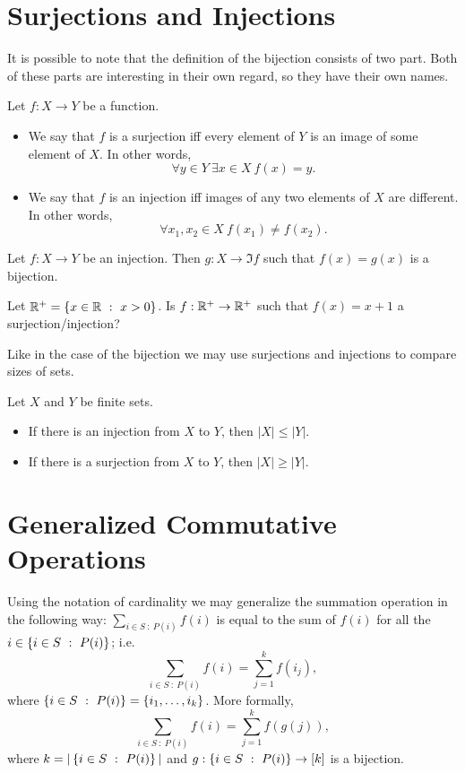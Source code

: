 \section{Surjections and Injections}

It is possible to note that the definition of the bijection consists of two part.
Both of these parts are interesting in their own regard, so they have their own
names.
\begin{definition}
    Let $f : X \to Y$ be a function.
    \begin{itemize}
        \item We say that $f$ is a surjection iff every element of $Y$ is an image
            of some element of $X$. In other words,
            \[
                \forall y \in Y~\exists x \in X\ f(x) = y.
            \]
        \item We say that $f$ is an injection iff images of any two elements
            of $X$ are different. In other words,
            \[
                \forall x_1, x_2 \in X\ f(x_1) \neq f(x_2).
            \]
    \end{itemize}
\end{definition}

\begin{remark}
    Let $f : X \to Y$ be an injection. Then $g : X \to \Im f$ such that
    $f(x) = g(x)$ is a bijection.
\end{remark}

\begin{exercise}
    Let $\R^+ = \set[x > 0]{x \in \R}$. Is $f : {\mathbb{R}}^+ \to {\mathbb{R}}^+$ such that
    $f(x) = x + 1$ a surjection/injection?
\end{exercise}

Like in the case of the bijection we may use surjections and injections to
compare sizes of sets.
\begin{theorem}
\label{theorem:injections-surjections-inequalities}
    Let $X$ and $Y$ be finite sets.
    \begin{itemize}
        \item If there is an injection from $X$ to $Y$, then $|X| \le |Y|$.
        \item If there is a surjection from $X$ to $Y$, then $|X| \ge |Y|$.
    \end{itemize}
\end{theorem}

\section{Generalized Commutative Operations}
\label{section:generalized-sum}
Using the notation of cardinality we may generalize the summation operation in
the following way: $\sum_{i \in S ~:~ P(i)} f(i)$ is equal to the sum of
$f(i)$ for all the $i \in \set[P(i)]{i \in S}$; i.e.
\[
    \sum_{i \in S ~:~ P(i)} f(i) = \sum_{j = 1}^k f(i_j),
\]
where $\set[P(i)]{i \in S} = \set{i_1, \dots, i_k}$. More formally,
\[
    \sum_{i \in S ~:~ P(i)} f(i) = \sum_{j = 1}^k f(g(j)),
\]
where $k = |\set[P(i)]{i \in S}|$ and $g : \set[P(i)]{i \in S} \to \range{k}$ is
a bijection.

